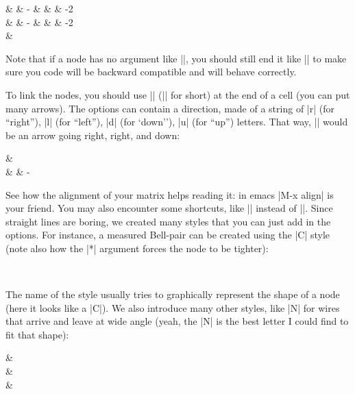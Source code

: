 \documentclass[a4paper]{ltxdoc}
\begin{document}
\begin{codeexample}[width=0pt]
\begin{ZX}
  \zxZ{} & \zxZ{\alpha} & \zxZ-{\alpha} & \zxZ{\alpha+\beta} &  & \zxFracZ-{\pi}{2}\\
  \zxX{} & \zxX{\alpha} & \zxX-{\alpha} & \zxX{\alpha+\beta} &  & \zxFracX-{\pi}{2}\\
  \zxN{} & \zxH{}
\end{ZX}
\end{codeexample}

Note that if a node has no argument like |\zxN|, you should still end it like |\zxN{}| to make sure you code will be backward compatible and will behave correctly.

To link the nodes, you should use |\arrow[options]| (|\ar[options]| for short) at the end of a cell (you can put many arrows). The options can contain a direction, made of a string of |r| (for ``right''), |l| (for ``left''), |d| (for `down''), |u| (for ``up'') letters. That way, |\ar[rrd]| would be an arrow going right, right, and down:
\begin{codeexample}[]
\begin{ZX}
  \zxZ{} \ar[rrd] & \zxX{}\\
                  &        & \zxX-{\alpha}
\end{ZX}
\end{codeexample}
See how the alignment of your matrix helps reading it: in emacs |M-x align| is your friend. You may also encounter some shortcuts, like |\rar| instead of |\ar[r]|. Since straight lines are boring, we created many styles that you can just add in the options. For instance, a measured Bell-pair can be created using the |C| style (note also how the |*| argument forces the node to be tighter):
\begin{codeexample}[]
\begin{ZX}
   \ar[d,C]\\
\end{ZX}
\end{codeexample}
The name of the style usually tries to graphically represent the shape of a node (here it looks like a |C|). We also introduce many other styles, like |N| for wires that arrive and leave at wide angle (yeah, the |N| is the best letter I could find to fit that shape):
\begin{codeexample}[]
\begin{ZX}
  \zxN{}                           & \zxZ{\beta}\\
  \zxZ{\alpha} \ar[ru,N] \ar[rd,N] &\\
                                   & \zxZ{\gamma}
\end{ZX}
\end{codeexample}
\end{document}
